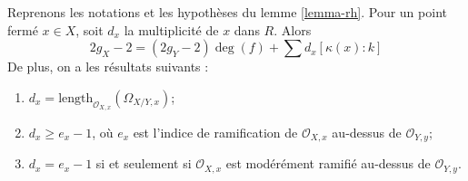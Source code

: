 \begin{lemma}
\label{lemma-rhe}
Reprenons les notations et les hypothèses du lemme \ref{lemma-rh}. Pour un point fermé $x \in X$, soit $d_x$ la multiplicité de $x$ dans $R$. Alors $$
2g_X - 2 = (2g_Y - 2) \deg(f) + \sum\nolimits d_x [\kappa(x) : k]
$$ De plus, on a les résultats suivants : \begin{enumerate} \item $d_x = \text{length}_{\mathcal{O}_{X, x}}(\Omega_{X/Y, x})$; \item $d_x \geq e_x - 1$, où $e_x$ est l'indice de ramification de $\mathcal{O}_{X, x}$ au-dessus de $\mathcal{O}_{Y, y}$; \item $d_x = e_x - 1$ si et seulement si $\mathcal{O}_{X, x}$ est modérément ramifié au-dessus de $\mathcal{O}_{Y, y}$.
\end{enumerate}
\end{lemma}

